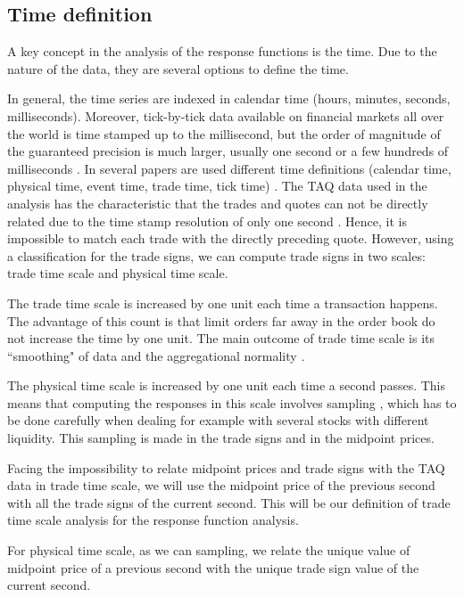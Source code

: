 \subsection{Time definition}\label{subsec:time_definition}

A key concept in the analysis of the response functions is the time. Due to the
nature of the data, they are several options to define the time.

In general, the time series are indexed in calendar time (hours, minutes,
seconds, milliseconds). Moreover, tick-by-tick data available on financial
markets all over the world is time stamped up to the millisecond, but the order
of magnitude of the guaranteed precision is much larger, usually one second or
a few hundreds of milliseconds \cite{empirical_facts}. In several papers are
used different time definitions (calendar time, physical time, event time,
trade time, tick time) \cite{empirical_facts,sampling_returns,market_making}.
The TAQ data used in the analysis has the characteristic that the trades and
quotes can not be directly related due to the time stamp resolution of only one
second \cite{Wang_2016_cross}. Hence, it is impossible to match each trade with
the directly preceding quote. However, using a classification for the trade
signs, we can compute trade signs in two scales: trade time scale and physical
time scale.

The trade time scale is increased by one unit each time a transaction happens.
The advantage of this count is that limit orders far away in the order book do
not increase the time by one unit. The main outcome of trade time scale is its
``smoothing" of data and the aggregational normality \cite{empirical_facts}.

The physical time scale is increased by one unit each time a second passes.
This means that computing the responses in this scale involves sampling
\cite{Wang_2016_cross,sampling_returns}, which has to be done carefully when
dealing for example with several stocks with different liquidity. This sampling
is made in the trade signs and in the midpoint prices.

Facing the impossibility to relate midpoint prices and trade signs with the TAQ
data in trade time scale, we will use the midpoint price of the previous second
with all the trade signs of the current second. This will be our definition of
trade time scale analysis for the response function analysis.

For physical time scale, as we can sampling, we relate the unique value of
midpoint price of a previous second with the unique trade sign value of the
current second.

